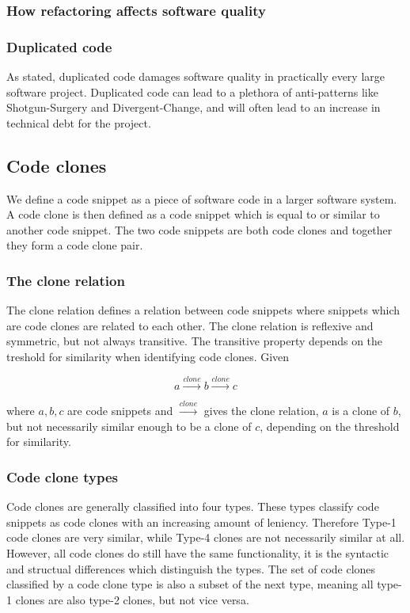 \documentclass[12pt]{article}
\begin{document}
\subsubsection{How refactoring affects software quality}

\subsubsection{Duplicated code}

As stated, duplicated code damages software quality in practically every large software
project. Duplicated code can lead to a plethora of anti-patterns like Shotgun-Surgery and
Divergent-Change, and will often lead to an increase in technical debt for the
project.\cite[99]{fowlerrefactoring}


\subsection{Code clones}

We define a code snippet as a piece of software code in a larger software system. A code
clone is then defined as a code snippet which is equal to or similar to another code
snippet. The two code snippets are both code clones and together they form a code clone
pair. 

\subsubsection{The clone relation}
The clone relation defines a relation between code snippets where snippets which are
code clones are related to each other. The clone relation is reflexive and symmetric, but
not always transitive. The transitive property depends on the treshold for similarity when
identifying code clones. Given

$$a \xrightarrow{clone} b \xrightarrow{clone} c$$

where $a,b,c$ are code snippets and $\xrightarrow{clone}$ gives the clone relation, $a$ is
a clone of $b$, but not necessarily similar enough to be a clone of $c$, depending on the
threshold for similarity.

\subsubsection{Code clone types}

Code clones are generally classified into four types.\cite{Inoue_introduction_to_cc} These
types classify code snippets as code clones with an increasing amount of leniency.
Therefore Type-1 code clones are very similar, while Type-4 clones are not necessarily
similar at all. However, all code clones do still have the same functionality, it is the
syntactic and structual differences which distinguish the types. The set of code clones
classified by a code clone type is also a subset of the next type, meaning all type-1
clones are also type-2 clones, but not vice versa.
\end{document}
